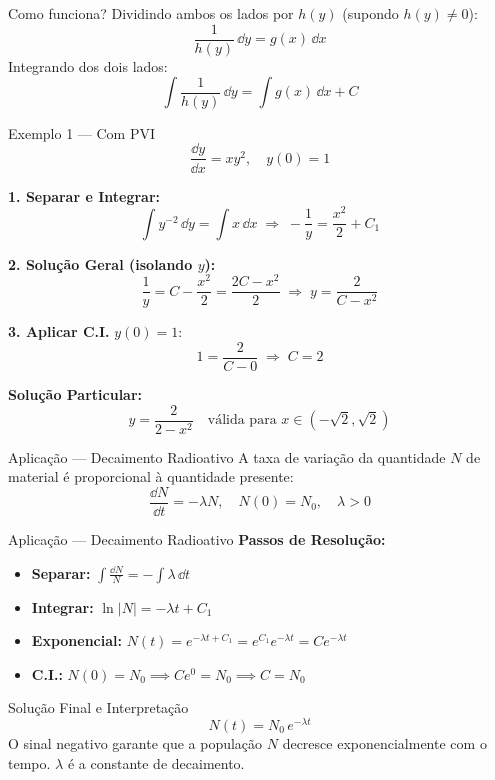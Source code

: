 \documentclass[11pt, aspectratio=169, xcolor=table]{beamer}
\begin{document}
\begin{frame}
\begin{block}{Como funciona?}
Dividindo ambos os lados por \(h(y)\) (supondo \(h(y)\neq 0\)):
\[
\frac{1}{h(y)}\,\dd y = g(x)\,\dd x
\]
Integrando dos dois lados:
\[
\int \frac{1}{h(y)}\,\dd y = \int g(x)\,\dd x + C
\]
\end{block}
\end{frame}

\begin{frame}{Exemplo 1 --- Com PVI}
\[
\frac{\dd y}{\dd x} = xy^2,\quad y(0)=1
\]

\textbf{1. Separar e Integrar:}
\[
\int y^{-2}\,\dd y = \int x\,\dd x
\;\Longrightarrow\;
-\frac{1}{y} = \frac{x^2}{2} + C_1
\]

\textbf{2. Solução Geral (isolando $y$):}
\[
\frac{1}{y} = C - \frac{x^2}{2} = \frac{2C-x^2}{2}
\;\Longrightarrow\;
y = \frac{2}{C-x^2}
\]
\end{frame}

\begin{frame}
\textbf{3. Aplicar C.I.} \(y(0)=1\):
\[
1 = \frac{2}{C-0} \;\Longrightarrow\; C=2
\]

\textbf{Solução Particular:}
\[
\boxed{y = \frac{2}{2-x^2}} \quad \text{válida para } x \in (-\sqrt{2}, \sqrt{2})
\]
\end{frame}

\begin{frame}{Aplicação --- Decaimento Radioativo}
A taxa de variação da quantidade $N$ de material é proporcional à quantidade presente:
\[
\frac{\dd N}{\dd t} = -\lambda N,\quad N(0)=N_0,\quad \lambda>0
\]
\end{frame}

\begin{frame}{Aplicação --- Decaimento Radioativo}
\textbf{Passos de Resolução:}
\begin{itemize}
  \item \textbf{Separar:} $\displaystyle \int \frac{\dd N}{N} = -\int \lambda\,\dd t$
  \item \textbf{Integrar:} $\ln|N| = -\lambda t + C_1$
  \item \textbf{Exponencial:} $N(t) = e^{-\lambda t + C_1} = e^{C_1}e^{-\lambda t} = Ce^{-\lambda t}$
  \item \textbf{C.I.:} $N(0)=N_0 \implies Ce^{0} = N_0 \implies C=N_0$
\end{itemize}
\end{frame}

\begin{frame}
\begin{block}{Solução Final e Interpretação}
\[
N(t) = N_0\,e^{-\lambda t}
\]
O sinal negativo garante que a população $N$ decresce exponencialmente com o tempo. $\lambda$ é a constante de decaimento.
\end{block}
\end{frame}
\end{document}
